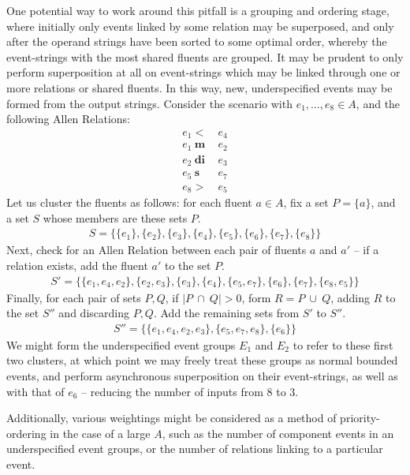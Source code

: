 \documentclass[a4paper,11pt]{article}
\begin{document}
One potential way to work around this pitfall is a grouping and ordering stage, 
where initially only events linked by some relation may be superposed, and only 
after the operand strings have been sorted to some optimal order, whereby the 
event-strings with the most shared fluents are grouped. It may be 
prudent to only perform superposition at all on event-strings which may be 
linked through one or more relations or shared fluents. In this way, new, 
underspecified events may be formed from the output strings. Consider the 
scenario with $e_1, \ldots, e_8 \in A$, and the following Allen 
Relations:
\begin{align*}
e_1 <& ~e_4\\
e_1 ~\mathbf{m}& ~e_2\\
e_2 ~\mathbf{di}& ~e_3\\
e_5 ~\mathbf{s}& ~e_7\\
e_8 >& ~e_5
\end{align*} 
Let us cluster the fluents as follows: for each fluent $a \in A$, fix a set $P 
= \{ a \}$, and a set $S$ whose members are these sets $P$.
\begin{align*}
S = \{\{e_1\},\{e_2\},\{e_3\},\{e_4\},\{e_5\},\{e_6\},\{e_7\},\{e_8\}\}
\end{align*}
Next, check for an Allen Relation between each pair of fluents $a$ and $a'$ -- 
if 
a relation exists, add the fluent $a'$ to the set $P$.
\begin{align*}
S' = \{\{e_1, e_4, e_2\},\{e_2, e_3\}, \{e_3\}, \{e_4\}, \{e_5, e_7\}, \{e_6\}, 
\{e_7\}, \{e_8, e_5\}\}
\end{align*}
Finally, for each pair of sets $P, Q$, if $|P ~\cap~ Q| > 0$, form $R = P ~\cup~
Q$, adding $R$ to the set $S''$ and discarding $P, Q$. Add the remaining sets 
from $S'$ to $S''$.
\begin{align*}
S'' = \{\{e_1, e_4, e_2, e_3\}, \{e_5, e_7, e_8\}, \{e_6\}\}
\end{align*}
We might form the underspecified event groups $E_1$ and 
$E_2$ to refer to these first two clusters, at which point we may freely treat 
these groups as normal bounded events, and perform asynchronous superposition 
on their event-strings, as well as with that of $e_6$ -- reducing the 
number of inputs from 8 to 3.

Additionally, various weightings might be considered as a method of 
priority-ordering in the case of a large $A$, such as the number of 
component events in an underspecified event groups, or the number of relations 
linking to a particular event.
\end{document}
